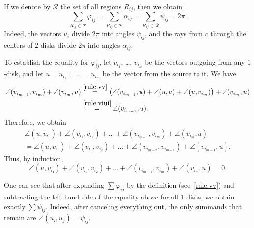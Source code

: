 
If we denote by $\mathcal{R}$ the set of all regions $R_{ij}$, then we obtain \begin{equation}\sum_{R_{ij}\in\mathcal{R}}\varphi_{ij} = \sum_{R_{ij}\in\mathcal{R}}\alpha_{ij} = \sum_{R_{ij}\in\mathcal{R}}\psi_{ij} = 2\pi.\label{eqn:sums-of-angles-are-2pi}
\end{equation}
Indeed, the vectors $u_i$ divide $2\pi$ into angles $\psi_{ij}$, and the rays from $c$ through the centers of $2$-disks divide $2\pi$ into angles $\alpha_{ij}$.

To establish the equality for $\varphi_{ij}$, let $v_{i_1}$, \ldots, $v_{i_m}$ be the vectors outgoing from any $1$-disk, and let $u = u_{i_1} = \ldots = u_{i_m}$ be the vector from the source to it.
We have
\begin{align*}
\angle(v_{i_{m-1}}, v_{i_m}) + \angle(v_{i_m}, u) & \stackrel{\ref{rule:vv}}{=} \big(\angle(v_{i_{m-1}}, u) + \angle(u, u) + \angle(u, v_{i_m})\big) + \angle(v_{i_m}, u) \\ & \stackrel{\ref{rule:viui}}{=} \angle(v_{i_{m-1}}, u).
\end{align*}
Therefore, we obtain
\begin{multline*}
\angle(u, v_{i_1}) + \angle(v_{i_1}, v_{i_2}) + \ldots + \angle(v_{i_{m-1}}, v_{i_m}) + \angle(v_{i_m}, u) \\
= \angle(u, v_{i_1}) + \angle(v_{i_1}, v_{i_2}) + \ldots + \angle(v_{i_{m-2}}, v_{i_{m-1}}) + \angle(v_{i_{m-1}}, u).
\end{multline*}
Thus, by induction,
$$\angle(u, v_{i_1}) + \angle(v_{i_1}, v_{i_2}) + \ldots + \angle(v_{i_{m-1}}, v_{i_m}) + \angle(v_{i_m}, u) = 0.$$


One can see that after expanding $\sum\varphi_{ij}$ by the definition (see~\ref{rule:vv}) and subtracting the left hand side of the equality above for all $1$-disks, we obtain exactly $\sum\psi_{ij}$. Indeed, after canceling everything out, the only summands that remain are $\angle(u_i, u_j) = \psi_{ij}$.

